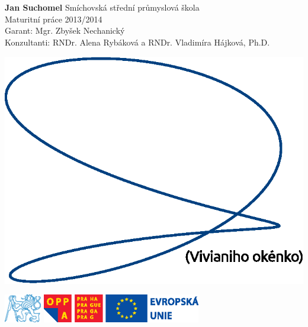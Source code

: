 \documentclass[12pt,a4paper]{report}
\begin{document}
\begin{titlepage}
	 \\
	\noindent \makebox[0pt][l]{\rule{1.5\textwidth}{1pt}} \\
	\noindent\textbf{\textsf{Jan Suchomel}} \textcolor{namecolor}{\textsf{Smíchovská střední průmyslová škola}} \\
	\noindent\textsf{Maturitní práce} \textcolor{namecolor}{\textsf{2013/2014}} \\[15pt]
	\textsf{Garant: Mgr. Zbyšek Nechanický} \\
	\textsf{Konzultanti: RNDr. Alena Rybáková a RNDr. Vladimíra Hájková, Ph.D.}
	\vfill
	\begin{center}
		\includegraphics[width = 400pt]{img/viviani-obalka.eps}
	\end{center}
	\vfill
	\includegraphics[height = 35pt]{img/logo_cvut.eps} \hfill \includegraphics[height = 35pt]{img/oppa.eps}
\end{titlepage}
	
\setcounter{tocdepth}{1}
\tableofcontents
	







	
\end{document}
